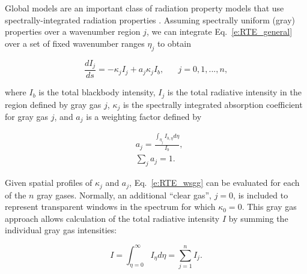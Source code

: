 \documentclass[preprint,12pt]{elsarticle}
\newcounter{bla}
\begin{document}
Global models are an important class of radiation property models that use spectrally-integrated radiation properties \cite{Hottel_1967,Modest_2013,Modest_2016}.
Assuming spectrally uniform (gray) properties over a wavenumber region $j$, we can integrate Eq.~\ref{e:RTE_general} over a set of fixed wavenumber ranges $\eta_j$ to obtain
%
\begin{linenomath}
\begin{equation} \label{e:RTE_wsgg}
    \frac{dI_j}{ds} = -\kappa_jI_j + a_j\kappa_jI_b, \hspace{20pt} j=0,1,...,n,
\end{equation}
\end{linenomath}
%
where $I_b$ is the total blackbody intensity, $I_j$ is the total radiative intensity in the region defined by gray gas $j$, $\kappa_j$ is the spectrally integrated absorption coefficient for gray gas $j$, and $a_j$ is a weighting factor defined by
%
\begin{linenomath}
\begin{align}
    &a_j= \frac{\int_{\eta_j}I_{b,\eta}d\eta}{I_b},\\
    &\sum_j a_j = 1.
\end{align}
\end{linenomath}
%
Given spatial profiles of $\kappa_j$ and $a_j$, Eq.~\ref{e:RTE_wsgg} can be evaluated for each of the $n$ gray gases. Normally, an additional ``clear gas'', $j=0$, is included to represent transparent windows in the spectrum for which $\kappa_0=0$.
This gray gas approach allows calculation of the total radiative intensity $I$ by summing the individual gray gas intensities:
%
\begin{linenomath}
\begin{equation}
I=\int_{\eta=0}^{\infty}I_{\eta}d\eta=\sum_{j=1}^n I_j.
\end{equation}
\end{linenomath}
%
\end{document}
